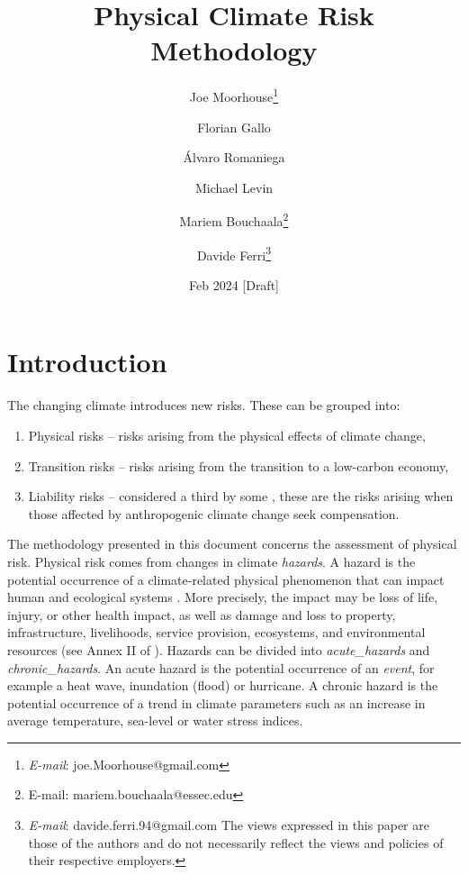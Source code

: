 \documentclass[a4paper,11pt]{extarticle} %
\title{Physical Climate Risk Methodology}
\author{Joe Moorhouse\thanks{\textit{E-mail}: joe.Moorhouse@gmail.com}
        \and
        Florian Gallo
        \and
        Álvaro Romaniega
        \and
        Michael Levin
        \and
        Mariem Bouchaala\thanks{{E-mail}: mariem.bouchaala@essec.edu}
        \and
        Davide Ferri\thanks{\textit{E-mail}: davide.ferri.94@gmail.com
        \smallskip
        \newline%
    The views expressed in this paper are those of the authors and do not necessarily reflect the views and policies of their respective employers.}
    }
\date{Feb 2024 [Draft]}
\theoremstyle{definition}
\begin{document}

\maketitle{}



\clearpage
\setcounter{tocdepth}{4}
\renewcommand{\contentsname}{Contents}
\tableofcontents




\clearpage
\section{Introduction}
\label{Sec:Introduction}

The changing climate introduces new risks. These can be grouped into:
\begin{enumerate}
    \item Physical risks -- risks arising from the physical effects of climate change,
    \item Transition risks -- risks arising from the transition to a low-carbon economy,
    \item Liability risks -- considered a third by some \cite{WoetzelEtAl:2020}, these are the risks arising when those affected by anthropogenic climate change seek compensation.
\end{enumerate}


The methodology presented in this document concerns the assessment of physical risk. Physical risk comes from changes in climate \emph{\gls{hazard}s}. A hazard is the potential occurrence of a climate-related physical phenomenon that can impact human and ecological systems \cite{ReisingerEtAl:2020}\cite{WoetzelEtAl:2020}\cite{MitchellEtAl:2017}. More precisely, the impact may be loss of life, injury, or other
health impact, as well as damage and loss to property, infrastructure,
livelihoods, service provision, ecosystems, and environmental resources (see Annex II of \cite{PortnerEtAl:2022}). Hazards can be divided into \emph{\gls{acute_hazard}s} and \emph{\gls{chronic_hazard}s}. An acute hazard is the potential occurrence of an \emph{event}, for example a heat wave, inundation (flood) or hurricane. A chronic hazard is the potential occurrence of a trend in climate parameters such as an increase in average temperature, sea-level or water stress indices.
\end{document}

